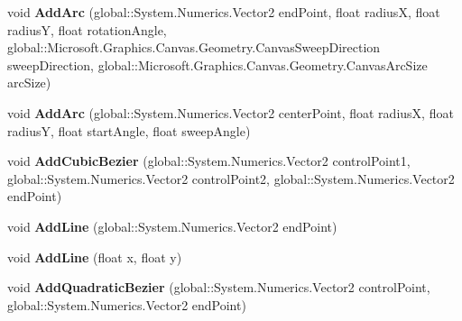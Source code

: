 \begin{DoxyCompactItemize}
void {\bfseries Add\+Arc} (global\+::\+System.\+Numerics.\+Vector2 end\+Point, float radiusX, float radiusY, float rotation\+Angle, global\+::\+Microsoft.\+Graphics.\+Canvas.\+Geometry.\+Canvas\+Sweep\+Direction sweep\+Direction, global\+::\+Microsoft.\+Graphics.\+Canvas.\+Geometry.\+Canvas\+Arc\+Size arc\+Size)
\item 
\mbox{\label{class_microsoft_1_1_graphics_1_1_canvas_1_1_geometry_1_1_canvas_path_builder_a5bc022c0799cfd3c392f412fc76aeb53}} 
void {\bfseries Add\+Arc} (global\+::\+System.\+Numerics.\+Vector2 center\+Point, float radiusX, float radiusY, float start\+Angle, float sweep\+Angle)
\item 
\mbox{\label{class_microsoft_1_1_graphics_1_1_canvas_1_1_geometry_1_1_canvas_path_builder_a192b933b8c38dcc6fd799668ab3a2e96}} 
void {\bfseries Add\+Cubic\+Bezier} (global\+::\+System.\+Numerics.\+Vector2 control\+Point1, global\+::\+System.\+Numerics.\+Vector2 control\+Point2, global\+::\+System.\+Numerics.\+Vector2 end\+Point)
\item 
\mbox{\label{class_microsoft_1_1_graphics_1_1_canvas_1_1_geometry_1_1_canvas_path_builder_a977ac73b78685510b323dc0f9f9d92a2}} 
void {\bfseries Add\+Line} (global\+::\+System.\+Numerics.\+Vector2 end\+Point)
\item 
\mbox{\label{class_microsoft_1_1_graphics_1_1_canvas_1_1_geometry_1_1_canvas_path_builder_ab36909f8900a9d581be0045841b600a6}} 
void {\bfseries Add\+Line} (float x, float y)
\item 
\mbox{\label{class_microsoft_1_1_graphics_1_1_canvas_1_1_geometry_1_1_canvas_path_builder_a2cf174a6a37788207d5f4464513863e4}} 
void {\bfseries Add\+Quadratic\+Bezier} (global\+::\+System.\+Numerics.\+Vector2 control\+Point, global\+::\+System.\+Numerics.\+Vector2 end\+Point)
\item 
\mbox{\label{class_microsoft_1_1_graphics_1_1_canvas_1_1_geometry_1_1_canvas_path_builder_a933ad60d19366b2851e3ad2a78ce363c}} 

\end{DoxyCompactItemize}
